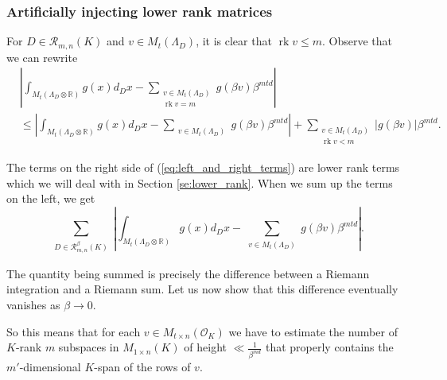 \documentclass{amsart}
\newcommand{\OK}{\mathcal{O}_K}
\DeclareMathOperator{\rank}{rk}
\begin{document}
\subsubsection{Artificially injecting lower rank matrices}

For $D \in \mathcal{R}_{m,n}(K)$ and $v \in M_t(\Lambda_D)$, it is clear that $\rank v \leq m$.
Observe that we can rewrite
\begin{align}
 & \left| \int_{M_t(\Lambda_{D} \otimes \mathbb{R})}g ( x)d_{D} x  - \sum_{\substack{v \in M_t(\Lambda_D) \\ \rank v = m}} g(\beta v ) \beta^{mtd} \right|
 \\ 
 & \leq 
 \left| \int_{M_t(\Lambda_D \otimes \mathbb{R})}  g ( x)d_{D} x  - \sum_{\substack{v \in M_t(\Lambda_D) }} g(\beta v ) \beta^{mtd} \right| + 
 \sum_{\substack{v \in M_t(\Lambda_D) \\ \rank v < m}} \left|g(\beta v)\right| \beta^{mtd} . 
 \label{eq:left_and_right_terms}
\end{align}


 
The terms on the right side of (\ref{eq:left_and_right_terms})
are lower rank terms which we will deal with in Section \ref{se:lower_rank}. When we sum up the terms on the left, we get 
\begin{equation}
 \sum_{\substack{D \in \mathcal{R}^{\beta}_{m,n}(K)  }}
 \left| \int_{M_t(\Lambda_D \otimes \mathbb{R})}g ( x)d_{D} x  - \sum_{\substack{v \in M_t(\Lambda_D) }} g(\beta v ) \beta^{mtd} \right|.
\end{equation}

The quantity being summed is precisely the difference between a Riemann integration and a Riemann sum. Let us now show that this difference eventually vanishes as $\beta \rightarrow 0$.  

 
 \iffalse
 
 So this means that for each $v \in M_{t \times n}(\OK)$
 we have to estimate the number of $K$-rank $m$ subspaces in  $M_{1 \times n}(K)$ 
 of height $\ll \frac{1}{\beta^{md}}$ that properly contains the $m'$-dimensional $K$-span of the rows of $v$.
\end{document}
